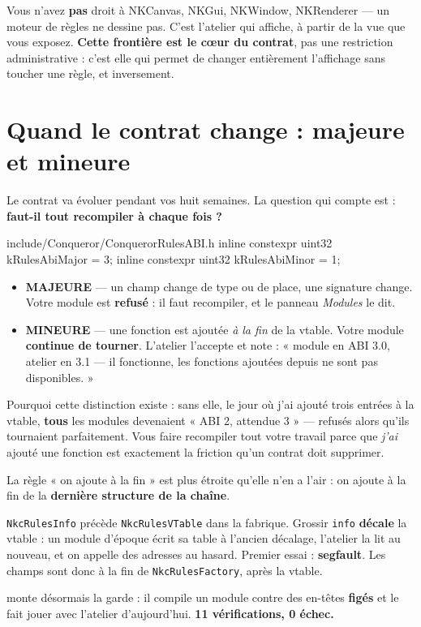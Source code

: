 Vous n'avez \textbf{pas} droit à NKCanvas, NKGui, NKWindow, NKRenderer — un
moteur de règles ne dessine pas. C'est l'atelier qui affiche, à partir de la vue
que vous exposez. \textbf{Cette frontière est le cœur du contrat}, pas une
restriction administrative : c'est elle qui permet de changer entièrement
l'affichage sans toucher une règle, et inversement.

\section{Quand le contrat change : majeure et mineure}

Le contrat va évoluer pendant vos huit semaines. La question qui compte est :
\textbf{faut-il tout recompiler à chaque fois ?}

\begin{nkcode}{include/Conqueror/ConquerorRulesABI.h}
inline constexpr uint32 kRulesAbiMajor = 3;
inline constexpr uint32 kRulesAbiMinor = 1;
\end{nkcode}

\begin{itemize}
  \item \textbf{MAJEURE} — un champ change de type ou de place, une signature
        change. Votre module est \textbf{refusé} : il faut recompiler, et le
        panneau \emph{Modules} le dit.
  \item \textbf{MINEURE} — une fonction est ajoutée \emph{à la fin} de la vtable.
        Votre module \textbf{continue de tourner}. L'atelier l'accepte et note :
        « module en ABI 3.0, atelier en 3.1 — il fonctionne, les fonctions
        ajoutées depuis ne sont pas disponibles. »
\end{itemize}

Pourquoi cette distinction existe : sans elle, le jour où j'ai ajouté trois
entrées à la vtable, \textbf{tous} les modules devenaient « ABI 2, attendue 3 » —
refusés alors qu'ils tournaient parfaitement. Vous faire recompiler tout votre
travail parce que \emph{j'ai} ajouté une fonction est exactement la friction
qu'un contrat doit supprimer.

\begin{nkpiege}
La règle « on ajoute à la fin » est plus étroite qu'elle n'en a l'air : on ajoute
à la fin de la \textbf{dernière structure de la chaîne}.

\texttt{NkcRulesInfo} précède \texttt{NkcRulesVTable} dans la fabrique. Grossir
\texttt{info} \textbf{décale} la vtable : un module d'époque écrit sa table à
l'ancien décalage, l'atelier la lit au nouveau, et on appelle des adresses au
hasard. Premier essai : \textbf{segfault}. Les champs sont donc à la fin de
\texttt{NkcRulesFactory}, après la vtable.

 monte désormais la garde : il compile un module
contre des en-têtes \textbf{figés} et le fait jouer avec l'atelier d'aujourd'hui.
\textbf{11 vérifications, 0 échec.}
\end{nkpiege}


